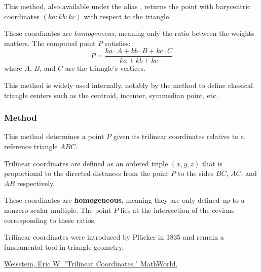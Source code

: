 This method, also available under the alias , returns the point with barycentric coordinates $(ka : kb : kc)$ with respect to the triangle.

\medskip

These coordinates are \emph{homogeneous}, meaning only the ratio between the weights matters. The computed point $P$ satisfies:
\[
P = \frac{ka \cdot A + kb \cdot B + kc \cdot C}{ka + kb + kc}
\]
where $A$, $B$, and $C$ are the triangle's vertices.

\medskip

This method is widely used internally, notably by the  method to define classical triangle centers such as the centroid, incenter, symmedian point, etc.


\vspace{1em}

\begin{tkzexample}[latex=.5\textwidth]
\end{tkzexample}

\subsubsection{Method }
\label{ssub:method_triangle_trilinear_x_y_z}

This method determines a point $P$ given its trilinear coordinates relative to a reference triangle $ABC$.

\medskip

Trilinear coordinates are defined as an ordered triple $(x, y, z)$ that is proportional to the directed distances from the point $P$ to the sides $BC$, $AC$, and $AB$ respectively.

\medskip

These coordinates are \textbf{homogeneous}, meaning they are only defined up to a nonzero scalar multiple. The point $P$ lies at the intersection of the cevians corresponding to these ratios.

\medskip

Trilinear coordinates were introduced by Plücker in 1835 and remain a fundamental tool in triangle geometry.
\begin{flushright}
\small
\href{https://mathworld.wolfram.com/TrilinearCoordinates.html}{Weisstein, Eric W. "Trilinear Coordinates." MathWorld.}
\end{flushright}

